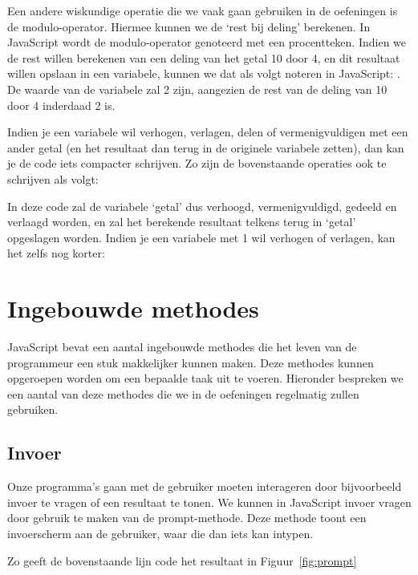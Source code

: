 Een andere wiskundige operatie die we vaak gaan gebruiken in de oefeningen is de modulo-operator. Hiermee kunnen we de `rest bij deling' berekenen. In JavaScript wordt de modulo-operator genoteerd met een procentteken. Indien we de rest willen berekenen van een deling van het getal 10 door 4, en dit resultaat willen opslaan in een variabele, kunnen we dat als volgt noteren in JavaScript: .
De waarde van de variabele  zal 2 zijn, aangezien de rest
van de deling van 10 door 4 inderdaad 2 is.

Indien je een variabele wil verhogen, verlagen, delen of vermenigvuldigen met een ander getal (en het resultaat dan terug in de originele variabele zetten), dan kan je de code iets compacter schrijven. Zo zijn de bovenstaande operaties ook te schrijven als volgt:


In deze code zal de variabele `getal' dus verhoogd, vermenigvuldigd, gedeeld en verlaagd worden, en zal het berekende resultaat telkens terug in `getal' opgeslagen worden. Indien je een variabele met 1 wil verhogen of verlagen, kan het zelfs nog korter:


\section{Ingebouwde methodes}

JavaScript bevat een aantal ingebouwde methodes die het leven van de programmeur een stuk makkelijker kunnen maken. Deze methodes kunnen opgeroepen worden om een bepaalde taak uit te voeren. Hieronder bespreken we een aantal van deze methodes die we in de oefeningen regelmatig zullen gebruiken.

\subsection{Invoer}

Onze programma's gaan met de gebruiker moeten interageren door bijvoorbeeld invoer te vragen of een resultaat te tonen. We kunnen in JavaScript invoer vragen door gebruik te maken van de prompt-methode. Deze methode toont een invoerscherm aan de gebruiker, waar die dan iets kan intypen.


Zo geeft de bovenstaande lijn code het resultaat in Figuur~\ref{fig:prompt}

